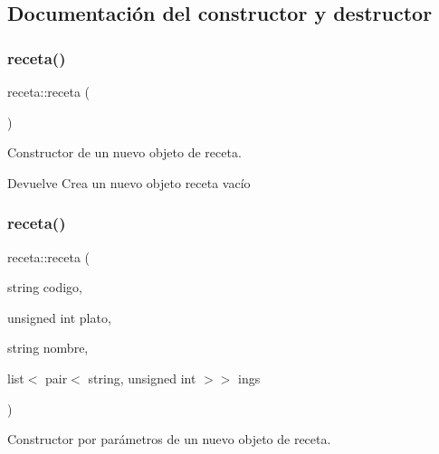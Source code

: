 \subsection{Documentación del constructor y destructor}
\mbox{\label{classreceta_ab103b4d892eaced39989fe3d705ca303}} 
\subsubsection{\texorpdfstring{receta()}{receta()}\hspace{0.1cm}{\footnotesize\ttfamily [1/3]}}
{\footnotesize\ttfamily receta\+::receta (\begin{DoxyParamCaption}{ }\end{DoxyParamCaption})}



Constructor de un nuevo objeto de receta. 

\begin{DoxyReturn}{Devuelve}
Crea un nuevo objeto receta vacío 
\end{DoxyReturn}
\mbox{\label{classreceta_aaa59345070162d628906101d8cd42ed2}} 
\subsubsection{\texorpdfstring{receta()}{receta()}\hspace{0.1cm}{\footnotesize\ttfamily [2/3]}}
{\footnotesize\ttfamily receta\+::receta (\begin{DoxyParamCaption}\item[{string}]{codigo,  }\item[{unsigned int}]{plato,  }\item[{string}]{nombre,  }\item[{list$<$ pair$<$ string, unsigned int $>$$>$}]{ings }\end{DoxyParamCaption})}



Constructor por parámetros de un nuevo objeto de receta. 


